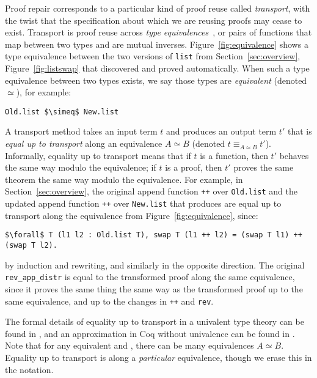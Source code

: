 Proof repair corresponds to a particular kind of proof reuse called \textit{transport},
with the twist that the specification about which we are reusing proofs may cease to exist.
Transport is proof reuse across \textit{type equivalences}~\cite{univalent2013homotopy},
or pairs of functions that map between two types and are mutual inverses.
Figure~\ref{fig:equivalence} shows a type equivalence between the two versions of \lstinline{list}
from Section~\ref{sec:overview}, Figure~\ref{fig:listswap} that \toolname discovered and proved automatically.
When such a type equivalence between two types exists, we say those types are \textit{equivalent} (denoted $\simeq$), for example:

\begin{lstlisting}
Old.list $\simeq$ New.list
\end{lstlisting}

A transport method takes an input term $t$ and produces an output term $t'$ that is \textit{equal up to transport}
along an equivalence $A \simeq B$ (denoted $t \equiv_{A \simeq B} t'$).
Informally, equality up to transport means that if $t$ is a function, then $t'$ behaves the same way modulo the equivalence;
if $t$ is a proof, then $t'$ proves the same theorem the same way modulo the equivalence.
For example, in Section~\ref{sec:overview}, the original append function \lstinline{++} over \lstinline{Old.list}
and the updated append function \lstinline{++} over \lstinline{New.list} that \toolname produces are
equal up to transport along the equivalence from Figure~\ref{fig:equivalence}, since:

\begin{lstlisting}
$\forall$ T (l1 l2 : Old.list T), swap T (l1 ++ l2) = (swap T l1) ++ (swap T l2).
\end{lstlisting}
by induction and rewriting, and similarly in the opposite direction.
The original \lstinline{rev_app_distr} is equal to the transformed proof along the same equivalence,
since it proves the same thing the same way as the transformed proof up to the same equivalence, and up to the changes in \lstinline{++}
and \lstinline{rev}.

The formal details of equality up to transport in a univalent type theory can be found in \citet{univalent2013homotopy}, and an approximation in Coq without univalence can be found in \citet{tabareau2017equivalences}.
Note that for any equivalent \A and \B, there can be many equivalences $A \simeq B$.
Equality up to transport is along a \textit{particular} equivalence, though we erase this in the notation.

